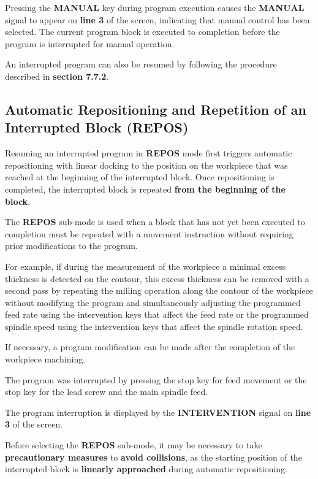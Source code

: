 Pressing the \textbf{MANUAL} key during program execution causes the \textbf{MANUAL} signal to appear on \textbf{line 3} of the screen,  
indicating that manual control has been selected.  
The current program block is executed to completion before the program is interrupted for manual operation.

An interrupted program can also be resumed by following the procedure described in \textbf{section 7.7.2}.

\subsection{Automatic Repositioning and Repetition of an Interrupted Block (REPOS)}

Resuming an interrupted program in \textbf{REPOS} mode first triggers automatic repositioning with linear docking to the position on the workpiece  
that was reached at the beginning of the interrupted block.  
Once repositioning is completed, the interrupted block is repeated \textbf{from the beginning of the block}.

The \textbf{REPOS} sub-mode is used when a block that has not yet been executed to completion  
must be repeated with a movement instruction without requiring prior modifications to the program.

\newpage

For example, if during the measurement of the workpiece a minimal excess thickness is detected on the contour,  
this excess thickness can be removed with a second pass by repeating the milling operation along the contour of the workpiece  
without modifying the program and simultaneously adjusting the programmed feed rate  
using the intervention keys that affect the feed rate or the programmed spindle speed  
using the intervention keys that affect the spindle rotation speed.

If necessary, a program modification can be made after the completion of the workpiece machining.

\procedure

The program was interrupted by pressing the stop key for feed movement  
or the stop key for the lead screw and the main spindle feed.

The program interruption is displayed by the \textbf{INTERVENTION} signal on \textbf{line 3} of the screen.

Before selecting the \textbf{REPOS} sub-mode, it may be necessary to take \textbf{precautionary measures}  
to \textbf{avoid collisions}, as the starting position of the interrupted block  
is \textbf{linearly approached} during automatic repositioning.

